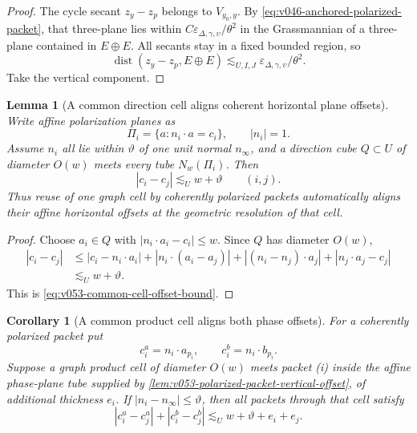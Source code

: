 \documentclass[10pt]{article}
\newtheorem{lemma}[theorem]{Lemma}
\newtheorem{corollary}[theorem]{Corollary}
\begin{document}
\begin{proof}
The cycle secant \(z_y-z_p\) belongs to \(V_{y_0,y}\).  By
\eqref{eq:v046-anchored-polarized-packet}, that three-plane lies within
\(C\varepsilon_{\Delta,\gamma,\upsilon}/\theta^2\) in the Grassmannian of a three-plane contained in
\(E\oplus E\).  All secants stay in a fixed bounded region, so
\[
\operatorname{dist}(z_y-z_p,E\oplus E)
\lesssim_{U,I,J}
\varepsilon_{\Delta,\gamma,\upsilon}/\theta^2.
\]
Take the vertical component.
\end{proof}

\begin{lemma}[A common direction cell aligns coherent horizontal plane offsets]
\label{lem:v053-common-cell-offset-alignment}
Write affine polarization planes as
\[
\Pi_i=\{a:n_i\cdot a=c_i\},
\qquad
|n_i|=1.
\]
Assume \(n_i\) all lie within \(\vartheta\) of one unit normal \(n_\infty\), and a direction cube
\(Q\subset U\) of diameter \(O(w)\) meets every tube \(N_w(\Pi_i)\).  Then
\begin{equation}
\label{eq:v053-common-cell-offset-bound}
\boxed{
|c_i-c_j|
\lesssim_U
w+\vartheta
\qquad(i,j).
}
\end{equation}
Thus reuse of one graph cell by coherently polarized packets automatically aligns their affine
horizontal offsets at the geometric resolution of that cell.
\end{lemma}

\begin{proof}
Choose \(a_i\in Q\) with \(|n_i\cdot a_i-c_i|\le w\).  Since \(Q\) has diameter \(O(w)\),
\[
\begin{aligned}
|c_i-c_j|
&\le
|c_i-n_i\cdot a_i|
+|n_i\cdot(a_i-a_j)|
+|(n_i-n_j)\cdot a_j|
+|n_j\cdot a_j-c_j|\\
&\lesssim_U
w+\vartheta.
\end{aligned}
\]
This is \eqref{eq:v053-common-cell-offset-bound}.
\end{proof}

\begin{corollary}[A common product cell aligns both phase offsets]
\label{cor:v053-common-cell-phase-offsets}
For a coherently polarized packet put
\[
c_i^a=n_i\cdot a_{p_i},
\qquad
c_i^b=n_i\cdot b_{p_i}.
\]
Suppose a graph product cell of diameter \(O(w)\) meets packet (i) inside the affine phase-plane
tube supplied by
\cref{lem:v053-polarized-packet-vertical-offset}, of additional thickness \(e_i\).  If
\(|n_i-n_\infty|\le\vartheta\), then all packets through that cell satisfy
\begin{equation}
\label{eq:v053-common-cell-phase-offset-bound}
\boxed{
|c_i^a-c_j^a|+|c_i^b-c_j^b|
\lesssim_U
w+\vartheta+e_i+e_j.
}
\end{equation}
\end{corollary}
\end{document}
